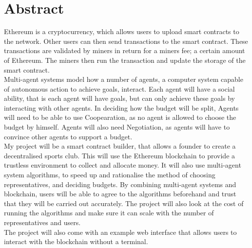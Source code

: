 \chapter{Abstract} \label{Chapter: Abstract}
Ethereum is a cryptocurrency, which allows users to upload smart contracts to the network. Other users can then send transactions to the smart contract. These transactions are validated by miners in return for a miners fee; a certain amount of Ethereum. The miners then run the transaction and update the storage of the smart contract.\\
Multi-agent systems model how a number of agents, a computer system capable of autonomous action to achieve goals, interact. Each agent will have a social ability, that is each agent will have goals, but can only achieve these goals by interacting with other agents. In deciding how the budget will be split, Agents will need to be able to use Coopearation, as no agent is allowed to choose the budget by himself. Agents will also need Negotiation, as agents will have to convince other agents to support a budget.  \\
My project will be a smart contract builder, that allows a founder to create a decentralised sports club. This will use the Ethereum blockchain to provide a trustless environment to collect and allocate money.  It will also use multi-agent system algorithms, to speed up and rationalise the method of choosing representatives, and deciding budgets. By combining multi-agent systems and blockchain, users will be able to agree to the algorithms beforehand and trust that they will be carried out accurately. The project will also look at the cost of running the algorithms and make sure it can scale with the number of representatives and users. \\
The project will also come with an example web interface that allows users to interact with the blockchain without a terminal. \\

